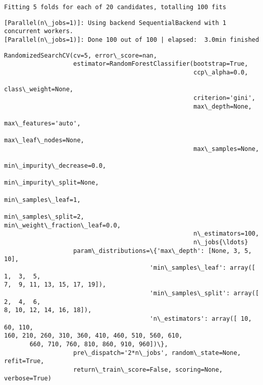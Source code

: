 \documentclass[11pt]{article}
\makeatletter
\newcommand{\boxspacing}{\kern\kvtcb@left@rule\kern\kvtcb@boxsep}
\newcommand{\prompt}[4]{
        \ttfamily\llap{{\color{#2}[#3]:\hspace{3pt}#4}}\vspace{-\baselineskip}
    }
\makeatother
\begin{document}
    \begin{Verbatim}[commandchars=\\\{\}]
Fitting 5 folds for each of 20 candidates, totalling 100 fits
    \end{Verbatim}

    \begin{Verbatim}[commandchars=\\\{\}]
[Parallel(n\_jobs=1)]: Using backend SequentialBackend with 1 concurrent workers.
[Parallel(n\_jobs=1)]: Done 100 out of 100 | elapsed:  3.0min finished
    \end{Verbatim}

            \begin{tcolorbox}[breakable, size=fbox, boxrule=.5pt, pad at break*=1mm, opacityfill=0]
\prompt{Out}{outcolor}{62}{\boxspacing}
\begin{Verbatim}[commandchars=\\\{\}]
RandomizedSearchCV(cv=5, error\_score=nan,
                   estimator=RandomForestClassifier(bootstrap=True,
                                                    ccp\_alpha=0.0,
                                                    class\_weight=None,
                                                    criterion='gini',
                                                    max\_depth=None,
                                                    max\_features='auto',
                                                    max\_leaf\_nodes=None,
                                                    max\_samples=None,
                                                    min\_impurity\_decrease=0.0,
                                                    min\_impurity\_split=None,
                                                    min\_samples\_leaf=1,
                                                    min\_samples\_split=2,
min\_weight\_fraction\_leaf=0.0,
                                                    n\_estimators=100,
                                                    n\_jobs{\ldots}
                   param\_distributions=\{'max\_depth': [None, 3, 5, 10],
                                        'min\_samples\_leaf': array([ 1,  3,  5,
7,  9, 11, 13, 15, 17, 19]),
                                        'min\_samples\_split': array([ 2,  4,  6,
8, 10, 12, 14, 16, 18]),
                                        'n\_estimators': array([ 10,  60, 110,
160, 210, 260, 310, 360, 410, 460, 510, 560, 610,
       660, 710, 760, 810, 860, 910, 960])\},
                   pre\_dispatch='2*n\_jobs', random\_state=None, refit=True,
                   return\_train\_score=False, scoring=None, verbose=True)
\end{Verbatim}
\end{tcolorbox}
        
\end{document}
